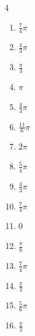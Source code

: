 \begin{multicols}{4}
\begin{enumerate}
  \item $\displaystyle \frac{7}{4}\pi$

  \item $\displaystyle \frac{4}{3}\pi$

\columnbreak %

  \item $\displaystyle \frac{\pi}{3}$

  \item $\displaystyle \pi$

  \item $\displaystyle \frac{4}{3}\pi$

  \item $\displaystyle \frac{11}{6}\pi$

  \item $\displaystyle 2\pi$

  \item $\displaystyle \frac{5}{4}\pi$

  \item $\displaystyle \frac{4}{3}\pi$

  \item $\displaystyle \frac{7}{4}\pi$

  \item $\displaystyle 0$

  \item $\displaystyle \frac{\pi}{6}$

  \item $\displaystyle \frac{7}{4}\pi$

  \item $\displaystyle \frac{\pi}{2}$

  \item $\displaystyle \frac{5}{6}\pi$

  \item $\displaystyle \frac{\pi}{2}$


\end{enumerate}
\end{multicols}
